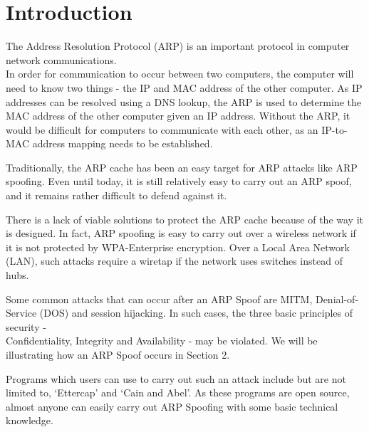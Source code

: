 \documentclass{acm_proc_article-sp}
\begin{document}




\section{Introduction}
The Address Resolution Protocol (ARP) is an important protocol in computer network communications. \\
In order for communication to occur between two computers, the computer will need to know two things - the IP and MAC address of the other computer. As IP addresses can be resolved using a DNS lookup, the ARP is used to determine the MAC address of the other computer given an IP address. Without the ARP, it would be difficult for computers to communicate with each other, as an IP-to-MAC address mapping needs to be established. 

Traditionally, the ARP cache has been an easy target for ARP attacks like ARP spoofing. Even until today, it is still relatively easy to carry out an ARP spoof, and it remains rather difficult to defend against it. 

There is a lack of viable solutions to protect the ARP cache because of the way it is designed. In fact, ARP spoofing is easy to carry out over a wireless network if it is not protected by WPA-Enterprise encryption. Over a Local Area Network (LAN), such attacks require a wiretap if the network uses switches instead of hubs. 

Some common attacks that can occur after an ARP Spoof are MITM, Denial-of-Service (DOS) and session hijacking. 
In such cases, the three basic principles of security -\\ Confidentiality, Integrity and Availability - may be violated. 
We will be illustrating how an ARP Spoof occurs in Section 2. 

Programs which users can use to carry out such an attack include but are not limited to, `Ettercap' and `Cain and Abel'. As these programs are open source, almost anyone can easily carry out ARP Spoofing with some basic technical knowledge. 
\end{document}

